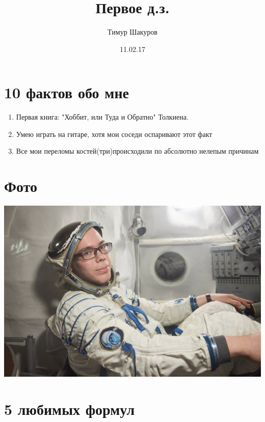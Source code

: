 \documentclass[11pt, a4paper]{article}
\author{Тимур Шакуров}
\title{Первое д.з.}
\date{11.02.17}
\begin{document}
\maketitle

\section{10 фактов обо мне}

\begin{enumerate}

\item Первая книга: "Хоббит, или Туда и Обратно" Толкиена.

\item Умею играть на гитаре, хотя мои соседи оспаривают этот факт

\item Все мои переломы костей(три)происходили по абсолютно нелепым причинам


\end{enumerate}

\section{Фото}

\includegraphics[scale=0.5]{me.jpg}

\section{5 любимых формул}
\end{document}
